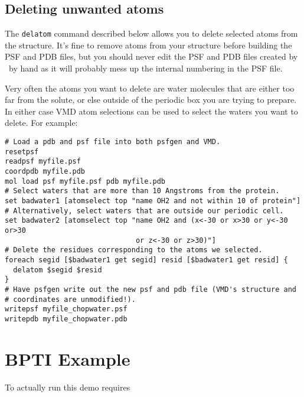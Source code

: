 \subsection{Deleting unwanted atoms}
The {\tt delatom} command described below allows you to delete selected
atoms from the structure.  It's fine to remove atoms from your structure
before building the PSF and PDB files, but you should never edit the PSF
and PDB files created by \PSFGEN\ by hand as it will probably mess up the
internal numbering in the PSF file.  

Very often the atoms you want to delete are water molecules that are
either too far from the solute, or else outside of the periodic box you
are trying to prepare.  In either case VMD atom selections can be used
to select the waters you want to delete.  For example:

\begin{verbatim}
# Load a pdb and psf file into both psfgen and VMD.
resetpsf
readpsf myfile.psf
coordpdb myfile.pdb
mol load psf myfile.psf pdb myfile.pdb
# Select waters that are more than 10 Angstroms from the protein.
set badwater1 [atomselect top "name OH2 and not within 10 of protein"]
# Alternatively, select waters that are outside our periodic cell.
set badwater2 [atomselect top "name OH2 and (x<-30 or x>30 or y<-30 or>30
                               or z<-30 or z>30)"]
# Delete the residues corresponding to the atoms we selected.
foreach segid [$badwater1 get segid] resid [$badwater1 get resid] {
  delatom $segid $resid
}
# Have psfgen write out the new psf and pdb file (VMD's structure and
# coordinates are unmodified!).
writepsf myfile_chopwater.psf
writepdb myfile_chopwater.pdb
\end{verbatim}


\section{BPTI Example}

To actually run this demo requires

